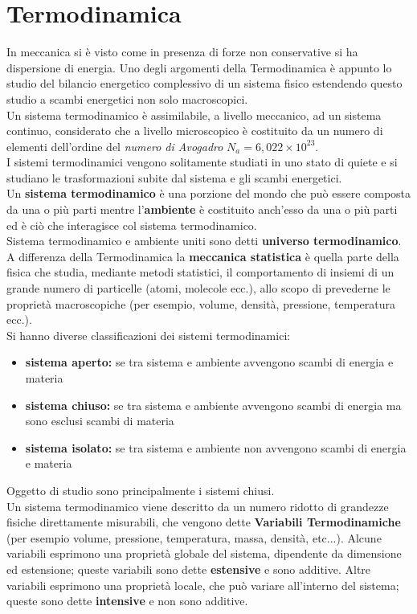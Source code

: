 \documentclass[a4paper,12pt, oneside]{book}
\begin{document}
\chapter{Termodinamica}
In meccanica si è visto come in presenza di forze non conservative si ha dispersione di energia. Uno degli argomenti della Termodinamica è appunto lo studio del bilancio energetico complessivo di un sistema fisico estendendo questo studio a scambi energetici non solo macroscopici. \\
Un sistema termodinamico è assimilabile, a livello meccanico, ad un sistema continuo, considerato che a livello microscopico è costituito da un numero di elementi dell'ordine del \textit{numero di Avogadro} $N_a=6,022\times 10^{23}$.\\
I sistemi termodinamici vengono solitamente studiati in uno stato di quiete e si studiano le trasformazioni subite dal sistema e gli scambi energetici.\\
Un \textbf{sistema termodinamico} è una porzione del mondo che può essere composta da una o più parti mentre l'\textbf{ambiente} è costituito anch'esso da una o più parti ed è ciò che interagisce col sistema termodinamico. \\
Sistema termodinamico e ambiente uniti sono detti \textbf{universo termodinamico}.\\
A differenza della Termodinamica la \textbf{meccanica statistica} è quella parte della fisica che studia, mediante metodi statistici, il comportamento di insiemi di un grande numero di particelle (atomi, molecole ecc.), allo scopo di prevederne le proprietà macroscopiche (per esempio, volume, densità, pressione, temperatura ecc.).\\
Si hanno diverse classificazioni dei sistemi termodinamici:
\begin{itemize}
\item \textbf{sistema aperto:} se tra sistema e ambiente avvengono scambi di energia e materia
\item \textbf{sistema chiuso:} se tra sistema e ambiente avvengono scambi di energia ma sono esclusi scambi di materia
\item \textbf{sistema isolato:} se tra sistema e ambiente non avvengono scambi di energia e materia
\end{itemize}
Oggetto di studio sono principalmente i sistemi chiusi.\\
Un sistema termodinamico viene descritto da un numero ridotto di grandezze fisiche direttamente misurabili, che vengono dette \textbf{Variabili Termodinamiche} (per esempio volume, pressione, temperatura, massa, densità, etc...). Alcune variabili esprimono una proprietà globale del sistema, dipendente da dimensione ed estensione; queste variabili sono dette \textbf{estensive} e sono additive. Altre variabili esprimono una proprietà locale, che può variare all'interno del sistema; queste sono dette \textbf{intensive} e non sono additive.\\
\end{document}
